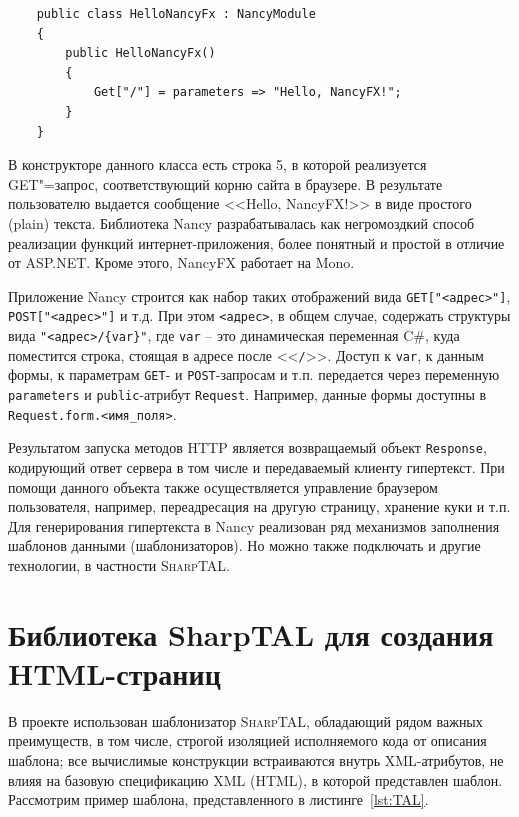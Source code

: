\documentclass[a4paper,14pt,openany,final]{extreport} %
\def\oldcaption{} \let\oldcaption=\caption
\def\caption{\stepcounter{captionsnum}\oldcaption}
\begin{document}
\begin{pzlisting}
\caption{Пример \protect\textsc{GET}-запроса на NancyFX}
    \begin{verbatim}
    public class HelloNancyFx : NancyModule
    {
        public HelloNancyFx()
        {
            Get["/"] = parameters => "Hello, NancyFX!";
        }
    }
\end{verbatim}
\end{pzlisting}
В конструкторе данного класса есть строка 5, в которой реализуется GET"=запрос, соответствующий корню сайта в браузере. В результате пользователю выдается сообщение <<Hello, NancyFX!>> в виде простого (plain) текста. Библиотека Nancy разрабатывалась как негромоздкий способ реализации функций интернет-приложения, более понятный и простой в отличие от ASP.NET. Кроме этого, NancyFX работает на Mono. %

Приложение Nancy строится как набор таких отображений вида \verb|GET["<адрес>"]|, \verb|POST["<адрес>"]| и т.д. При этом \verb|<адрес>|, в общем случае, содержать структуры вида \verb|"<адрес>/{var}"|, где \verb|var| -- это динамическая переменная C\#, куда поместится строка, стоящая в адресе после <<\verb|/|>>. Доступ к \verb|var|, к данным формы, к параметрам \verb|GET|- и \verb|POST|-запросам и т.п. передается через переменную \verb|parameters| и \verb|public|-атрибут \verb|Request|. Например, данные формы доступны в \verb|Request.form.<имя_поля>|.

Результатом запуска методов HTTP является возвращаемый объект \verb|Response|, кодирующий ответ сервера в том числе и передаваемый клиенту гипертекст. При помощи данного объекта также осуществляется управление браузером пользователя, например, переадресация на другую страницу, хранение куки и т.п.  Для генерирования гипертекста в Nancy реализован ряд механизмов заполнения шаблонов данными (шаблонизаторов). Но можно также подключать и другие технологии, в частности \textsc{SharpTAL}.


\section{Библиотека SharpTAL для создания HTML-страниц}
В проекте использован шаблонизатор \textsc{SharpTAL}, обладающий рядом важных преимуществ, в том числе, строгой изоляцией исполняемого кода от описания шаблона; все вычислимые конструкции встраиваются внутрь XML-атрибутов, не влияя на базовую спецификацию XML (HTML), в которой представлен шаблон.  Рассмотрим пример шаблона, представленного в листинге~\ref{lst:TAL}.
\end{document}
